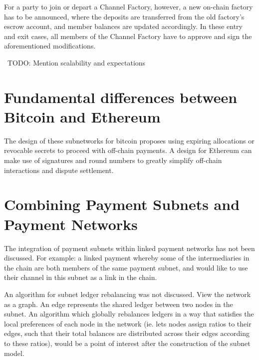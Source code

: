 \documentclass[12pt]{article}
\newcommand{\todo}[1]{{\color{red}\ TODO: {#1}}}
\begin{document}
For a party to join or depart a Channel Factory, however, a new on-chain factory has to be announced, where the deposits are transferred from the old factory's escrow account, and member balances are updated accordingly. In these entry and exit cases, all members of the Channel Factory have to approve and sign the aforementioned modifications.

\todo{Mention scalability and expectations}


\section{Fundamental differences between Bitcoin and Ethereum}
The design of these subnetworks for bitcoin proposes using expiring allocations or revocable secrets to proceed with off-chain payments. A design for Ethereum can make use of signatures and round numbers to greatly simplify off-chain interactions and dispute settlement.

\section{Combining Payment Subnets and Payment Networks}

The integration of payment subnets within linked payment networks has not been discussed. For example: a linked payment whereby some of the intermediaries in the chain are both members of the same payment subnet, and would like to use their channel in this subnet as a link in the chain.

An algorithm for subnet ledger rebalancing was not discussed. View the network as a graph. An edge represents the shared ledger between two nodes in the subnet. An algorithm which globally rebalances ledgers in a way that satisfies the local preferences of each node in the network (ie. lets nodes assign ratios to their edges, such that their total balances are distributed across their edges according to these ratios), would be a point of interest after the construction of the subnet model.
\end{document}
